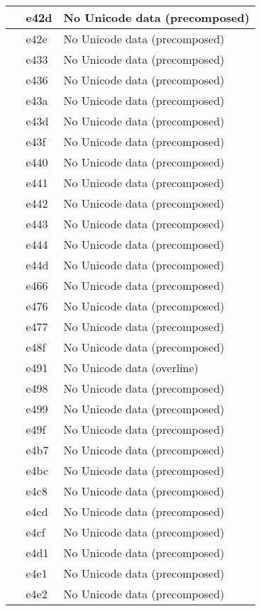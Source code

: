 \documentclass[12pt,letterpaper,openany]{book}
\begin{document}
\begin{center}
\begin{supertabular}{|m{0.25in}|m{0.5in}|m{4in}|}
			 & e42d & No Unicode data (precomposed)\\\hline
			 & e42e & No Unicode data (precomposed)\\\hline
			 & e433 & No Unicode data (precomposed)\\\hline
			 & e436 & No Unicode data (precomposed)\\\hline
			 & e43a & No Unicode data (precomposed)\\\hline
			 & e43d & No Unicode data (precomposed)\\\hline
			 & e43f & No Unicode data (precomposed)\\\hline
			 & e440 & No Unicode data (precomposed)\\\hline
			 & e441 & No Unicode data (precomposed)\\\hline
			 & e442 & No Unicode data (precomposed)\\\hline
			 & e443 & No Unicode data (precomposed)\\\hline
			 & e444 & No Unicode data (precomposed)\\\hline
			 & e44d & No Unicode data (precomposed)\\\hline
			 & e466 & No Unicode data (precomposed)\\\hline
			 & e476 & No Unicode data (precomposed)\\\hline
			 & e477 & No Unicode data (precomposed)\\\hline
			 & e48f & No Unicode data (precomposed)\\\hline
			 & e491 & No Unicode data (overline)\\\hline
			 & e498 & No Unicode data (precomposed)\\\hline
			 & e499 & No Unicode data (precomposed)\\\hline
			 & e49f & No Unicode data (precomposed)\\\hline
			 & e4b7 & No Unicode data (precomposed)\\\hline
			 & e4bc & No Unicode data (precomposed)\\\hline
			 & e4c8 & No Unicode data (precomposed)\\\hline
			 & e4cd & No Unicode data (precomposed)\\\hline
			 & e4cf & No Unicode data (precomposed)\\\hline
			 & e4d1 & No Unicode data (precomposed)\\\hline
			 & e4e1 & No Unicode data (precomposed)\\\hline
			 & e4e2 & No Unicode data (precomposed)\\\hline

\end{supertabular}
\end{center}
\end{document}
